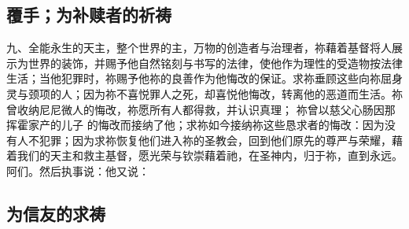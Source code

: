 
\subsection{覆手；为补赎者的祈祷}

九、全能永生的天主，整个世界的主，万物的创造者与治理者，祢藉着基督将人展示为世界的装饰，并赐予他自然铭刻与书写的法律，使他作为理性的受造物按法律生活；当他犯罪时，祢赐予他祢的良善作为他悔改的保证。求祢垂顾这些向祢屈身灵与颈项的人；因为祢不喜悦罪人之死，却喜悦他悔改，转离他的恶道而生活。祢曾收纳尼尼微人的悔改，祢愿所有人都得救，并认识真理； 祢曾以慈父心肠因那挥霍家产的儿子  的悔改而接纳了他；求祢如今接纳祢这些恳求者的悔改：因为没有人不犯罪；因为求祢恢复他们进入祢的圣教会，回到他们原先的尊严与荣耀，藉着我们的天主和救主基督，愿光荣与钦崇藉着祂，在圣神内，归于祢，直到永远。阿们。然后执事说：他又说：\newline{}\par


\subsection{为信友的求祷}

